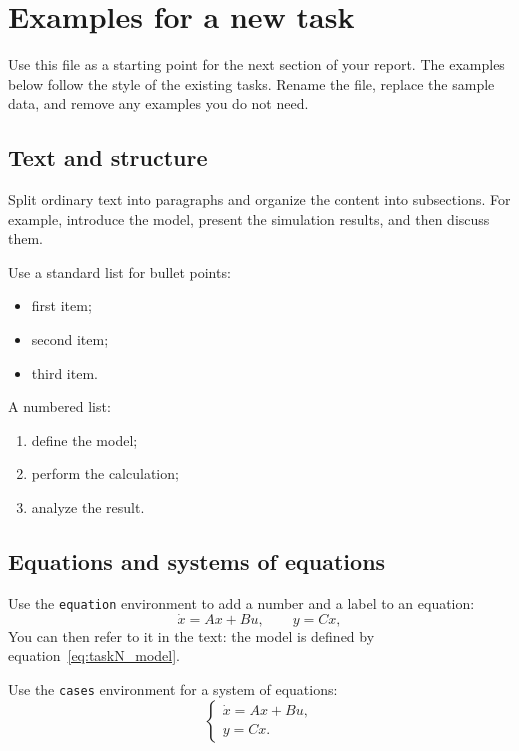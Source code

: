 \section{Examples for a new task}

Use this file as a starting point for the next section of your report. The
examples below follow the style of the existing tasks. Rename the file,
replace the sample data, and remove any examples you do not need.

\subsection{Text and structure}
Split ordinary text into paragraphs and organize the content into subsections.
For example, introduce the model, present the simulation results, and then
discuss them.

Use a standard list for bullet points:
\begin{itemize}
    \item first item;
    \item second item;
    \item third item.
\end{itemize}

A numbered list:
\begin{enumerate}
    \item define the model;
    \item perform the calculation;
    \item analyze the result.
\end{enumerate}

\subsection{Equations and systems of equations}
Use the \texttt{equation} environment to add a number and a label to an equation:
\begin{equation}
    \dot{x} = Ax + Bu, \qquad y = Cx,
    \label{eq:taskN_model}
\end{equation}
You can then refer to it in the text: the model is defined by
equation~\eqref{eq:taskN_model}.

Use the \texttt{cases} environment for a system of equations:
\begin{equation}
    \begin{cases}
        \dot{x} = Ax + Bu, \\
        y = Cx.
    \end{cases}
\end{equation}

